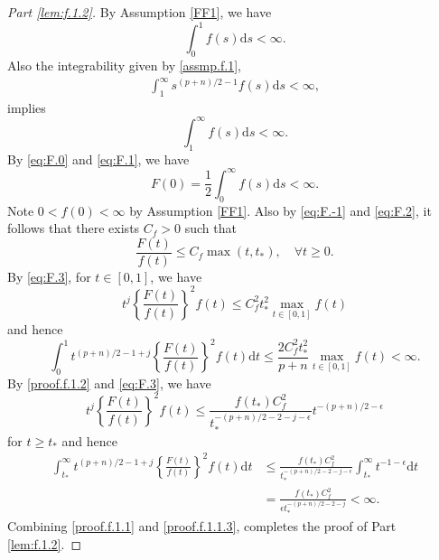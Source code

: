 \documentclass[preprint,11pt]{imsart}
\numberwithin{equation}{section}
\theoremstyle{plain}
\theoremstyle{definition}
\theoremstyle{remark}
\newcommand{\rd}{\mathrm{d}}
\begin{document}
\begin{proof}
[Part \ref{lem:f.1.2}]  By Assumption \ref{FF1}, we have
\begin{equation}\label{eq:F.0}
 \int_0^1 f(s) \rd s<\infty.
\end{equation}
 Also the integrability given by \eqref{assmp.f.1},
 \begin{align*}
 \int_1^\infty s^{(p+n)/2-1}f(s) \rd s<\infty,
 \end{align*}
implies
\begin{equation}\label{eq:F.1}
 \int_1^\infty f(s) \rd s<\infty.
\end{equation}
By \eqref{eq:F.0} and \eqref{eq:F.1}, we have
\begin{equation}\label{eq:F.2}
F(0)= \frac{1}{2}\int_0^\infty f(s) \rd s<\infty.
\end{equation}
Note $0<f(0)<\infty$ by Assumption \ref{FF1}. Also by \eqref{eq:F.-1} and \eqref{eq:F.2},
it follows that there exists $C_f>0$ such that
\begin{equation}\label{eq:F.3}
 \frac{F(t)}{f(t)}\leq C_f\max(t,t_*),\quad \forall t\geq 0.
\end{equation}
 By \eqref{eq:F.3}, for $t\in[0,1]$, we have
\begin{equation}\label{proof.f.1}
t^{j}\left\{\frac{F(t)}{f(t)}\right\}^2f(t) \leq C_f^2t_*^2\max_{t\in[0,1]}f(t) 
\end{equation}
 and hence
\begin{equation}\label{proof.f.1.1}
 \int_0^1 t^{(p+n)/2-1+j}\left\{\frac{F(t)}{f(t)}\right\}^2f(t) \rd t  
\leq \frac{2C_f^2t_*^2}{p+n}\max_{t\in[0,1]}f(t) <\infty.
\end{equation}
By \eqref{proof.f.1.2} and \eqref{eq:F.3},  we have
\begin{equation}\label{proof.f.2}
 t^{j}\left\{\frac{F(t)}{f(t)}\right\}^2f(t) \leq \frac{f(t_*)C_f^2}{t_*^{-(p+n)/2-2-j-\epsilon}}
  t^{-(p+n)/2-\epsilon}
\end{equation}
for $t\geq t_*$ and hence
\begin{equation}\label{proof.f.1.1.3}
 \begin{split}
 \int_{t_*}^\infty t^{(p+n)/2-1+j}\left\{\frac{F(t)}{f(t)}\right\}^2f(t) \rd t 
&\leq \frac{f(t_*)C_f^2}{t_*^{-(p+n)/2-2-j-\epsilon}}\int_{t_*}^\infty t^{-1-\epsilon}\rd t \\
  &= \frac{f(t_*)C_f^2}{\epsilon t_*^{-(p+n)/2-2-j}} <\infty.  
 \end{split}
\end{equation} 
Combining \eqref{proof.f.1.1} and \eqref{proof.f.1.1.3}, completes the proof of Part \ref{lem:f.1.2}.


\end{proof}
\end{document}
